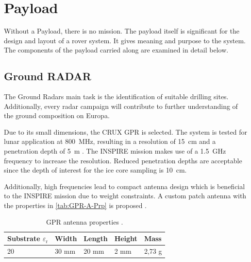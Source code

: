
\chapter{Payload}
\label{chap:payload}

Without a Payload, there is no mission. The payload itself is significant for the design and layout of a rover system. It gives meaning and purpose to the system. The components of the payload carried along are examined in detail below. 

\section{Ground RADAR}
The Ground Radars main task is the identification of suitable drilling sites. Additionally, every radar campaign will contribute to further understanding of the ground composition on Europa.

Due to its small dimensions, the CRUX GPR is selected. The system is tested for lunar application at 800~MHz, resulting in a resolution of 15~cm and a penetration depth of 5~m \cite{CRUX_GPR}. The INSPIRE mission makes use of a 1.5~GHz frequency to increase the resolution. 
Reduced penetration depths are acceptable since the depth of interest for the ice core sampling is 10~cm.

Additionally, high frequencies lead to compact antenna design which is beneficial to the INSPIRE mission due to weight constraints. 
A custom patch antenna with the properties in \autoref{tab:GPR-A-Prp} is proposed \cite{patch_ant_GPR, Patch_Ant_design}.

\begin{table}[h]
\centering
\begin{tabular}{lllll}
\toprule
Substrate ${\varepsilon}_\text{r}$ & Width & Length & Height & Mass   \\
\midrule
20                         & 30 mm & 20 mm  & 2 mm   & 2,73 g  \\
\bottomrule
\end{tabular}
\caption{GPR antenna properties \cite{Patch_Ant_design}.}
\label{tab:GPR-A-Prp}
\end{table}

